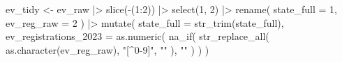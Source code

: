 \documentclass[
  letterpaper,
  DIV=11,
  numbers=noendperiod]{scrartcl}
\newenvironment{Shaded}{\begin{snugshade}}{\end{snugshade}}
\newcommand{\AttributeTok}[1]{\textcolor[rgb]{0.40,0.45,0.13}{#1}}
\newcommand{\DecValTok}[1]{\textcolor[rgb]{0.68,0.00,0.00}{#1}}
\newcommand{\FunctionTok}[1]{\textcolor[rgb]{0.28,0.35,0.67}{#1}}
\newcommand{\NormalTok}[1]{\textcolor[rgb]{0.00,0.23,0.31}{#1}}
\newcommand{\OtherTok}[1]{\textcolor[rgb]{0.00,0.23,0.31}{#1}}
\newcommand{\SpecialCharTok}[1]{\textcolor[rgb]{0.37,0.37,0.37}{#1}}
\newcommand{\StringTok}[1]{\textcolor[rgb]{0.13,0.47,0.30}{#1}}
\begin{document}
\begin{Shaded}
\begin{Highlighting}[]
\NormalTok{ev\_tidy }\OtherTok{\textless{}{-}}
\NormalTok{  ev\_raw }\SpecialCharTok{|\textgreater{}}
  \FunctionTok{slice}\NormalTok{(}\SpecialCharTok{{-}}\NormalTok{(}\DecValTok{1}\SpecialCharTok{:}\DecValTok{2}\NormalTok{)) }\SpecialCharTok{|\textgreater{}}
  \FunctionTok{select}\NormalTok{(}\DecValTok{1}\NormalTok{, }\DecValTok{2}\NormalTok{) }\SpecialCharTok{|\textgreater{}}
  \FunctionTok{rename}\NormalTok{(}
    \AttributeTok{state\_full =} \DecValTok{1}\NormalTok{,}
    \AttributeTok{ev\_reg\_raw =} \DecValTok{2}
\NormalTok{  ) }\SpecialCharTok{|\textgreater{}}
  \FunctionTok{mutate}\NormalTok{(}
    \AttributeTok{state\_full =} \FunctionTok{str\_trim}\NormalTok{(state\_full),}
    \AttributeTok{ev\_registrations\_2023 =} \FunctionTok{as.numeric}\NormalTok{(}
      \FunctionTok{na\_if}\NormalTok{(}
        \FunctionTok{str\_replace\_all}\NormalTok{(}
          \FunctionTok{as.character}\NormalTok{(ev\_reg\_raw),}
          \StringTok{"[\^{}0{-}9]"}\NormalTok{,}
          \StringTok{""}
\NormalTok{        ),}
        \StringTok{""}
\NormalTok{      )}
\NormalTok{    )}
\NormalTok{  )}


\end{Highlighting}
\end{Shaded}
\end{document}
